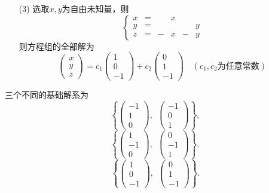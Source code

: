 \begin{frame}
  \begin{jie}[续]
    \begin{itemize}
    \item[(3)] 选取$x,y$为自由未知量，则
      $$
      \left\{
        \begin{array}{cccccc}
          x&=&&x&&\\
          y&=&&&&y\\
          z&=&-&x&-&y
        \end{array}
      \right.
      $$
      则方程组的全部解为
      $$
      \left(
        \begin{array}{r}
          x\\y\\z
        \end{array}
      \right) = c_1      \left(
        \begin{array}{r}
          1\\0\\-1
        \end{array}
      \right) + c_2      \left(
        \begin{array}{r}
          0\\1\\-1
        \end{array}
      \right) \quad (c_1,c_2\mbox{为任意常数})
      $$
    \end{itemize}
  \end{jie}
\end{frame}

\begin{frame}
  三个不同的基础解系为
  $$
  \left\{
    \left(
      \begin{array}{r}
        -1\\1\\0
      \end{array}
    \right),~~
    \left(
      \begin{array}{r}
        -1\\0\\1
      \end{array}
    \right)
  \right\},
  $$
  $$
  \left\{
    \left(
      \begin{array}{r}
        1\\-1\\0
      \end{array}
    \right),~~
    \left(
      \begin{array}{r}
        0\\-1\\1
      \end{array}
    \right)
  \right\},
  $$
  $$
  \left\{
    \left(
      \begin{array}{r}
        1\\0\\-1
      \end{array}
    \right),~~
    \left(
      \begin{array}{r}
        0\\1\\-1
      \end{array}
    \right)
  \right\}.
  $$
\end{frame}


